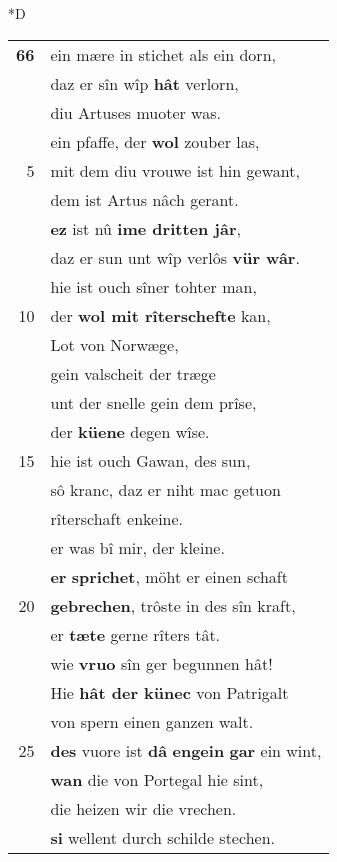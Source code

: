 \documentclass[8pt,a4paper,notitlepage]{article}
\begin{document}
\begin{table}[ht]
\begin{minipage}[t]{0.5\linewidth}
\small
\begin{center}*D
\end{center}
\begin{tabular}{rl}
\textbf{66} & ein mære in stichet als ein dorn,\\ 
 & daz er sîn wîp \textbf{hât} verlorn,\\ 
 & diu Artuses muoter was.\\ 
 & ein pfaffe, der \textbf{wol} zouber las,\\ 
5 & mit dem diu vrouwe ist hin gewant,\\ 
 & dem ist Artus nâch gerant.\\ 
 & \textbf{ez} ist nû \textbf{ime dritten jâr},\\ 
 & daz er sun unt wîp verlôs \textbf{vür wâr}.\\ 
 & hie ist ouch sîner tohter man,\\ 
10 & der \textbf{wol mit rîterschefte} kan,\\ 
 & Lot von Norwæge,\\ 
 & gein valscheit der træge\\ 
 & unt der snelle gein dem prîse,\\ 
 & der \textbf{küene} degen wîse.\\ 
15 & hie ist ouch Gawan, des sun,\\ 
 & sô kranc, daz er niht mac getuon\\ 
 & rîterschaft enkeine.\\ 
 & er was bî mir, der kleine.\\ 
 & \textbf{er} \textbf{sprichet}, möht er einen schaft\\ 
20 & \textbf{gebrechen}, trôste in des sîn kraft,\\ 
 & er \textbf{tæte} gerne rîters tât.\\ 
 & wie \textbf{vruo} sîn ger begunnen hât!\\ 
 & Hie \textbf{hât der künec} von Patrigalt\\ 
 & von spern einen ganzen walt.\\ 
25 & \textbf{des} vuore ist \textbf{dâ} \textbf{engein} \textbf{gar} ein wint,\\ 
 & \textbf{wan} die von Portegal hie sint,\\ 
 & die heizen wir die vrechen.\\ 
 & \textbf{si} wellent durch schilde stechen.\\ 

\end{tabular}
\end{minipage}
\end{table}
\end{document}
